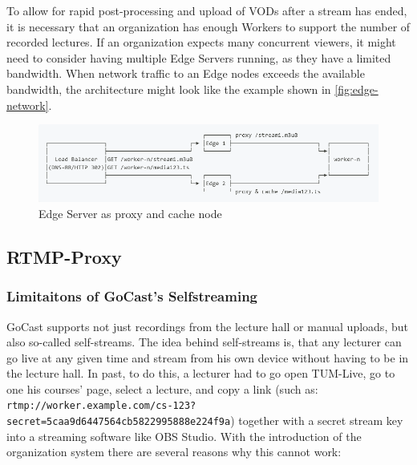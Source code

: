 To allow for rapid post-processing and upload of \ac{VOD}s after a stream has ended, it is necessary that an organization has enough Workers to support the number of recorded lectures.
If an organization expects many concurrent viewers, it might need to consider having multiple Edge Servers running, as they have a limited bandwidth.
When network traffic to an Edge nodes exceeds the available bandwidth, the architecture might look like the example shown in \autoref{fig:edge-network}.

\begin{figure}[htpb]
    \centering
    \includegraphics[width=\linewidth]{images/EdgeNetwork.png}
    \caption[Edge Server as proxy and cache node]{Edge Server as proxy and cache node}\label{fig:edge-network}
\end{figure}


\subsection{RTMP-Proxy}

\subsubsection{Limitaitons of GoCast's Selfstreaming}

GoCast supports not just recordings from the lecture hall or manual uploads, but also so-called self-streams. The idea behind self-streams is, that any lecturer can go live at any given time and stream from his own device without having to be in the lecture hall. In past, to do this, a lecturer had to go open TUM-Live, go to one his courses' page, select a lecture, and copy a link (such as: \texttt{rtmp://worker.example.com/cs-123? secret=5caa9d6447564cb5822995888e224f9a}) together with a secret stream key into a streaming software like OBS Studio. With the introduction of the organization system there are several reasons why this cannot work:

